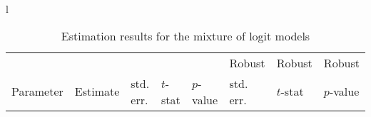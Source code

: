 \documentclass[12pt,a4paper]{article}
\begin{document}
\begin{sidewaystable}[htb]
\caption{\protect\label{tab:choiceOnly}Estimation results for the mixture of logit
models}
  \begin{tabular}{l}
\begin{tabular}{lr@{.}lr@{.}lr@{.}lr@{.}lr@{.}lr@{.}lr@{.}l}
                      &   \multicolumn{2}{l}{}    & \multicolumn{2}{l}{} & \multicolumn{2}{l}{}  &     \multicolumn{2}{l}{} &   \multicolumn{2}{l}{Robust}    & \multicolumn{2}{l}{Robust}  &     \multicolumn{2}{l}{Robust}   \\
Parameter      & \multicolumn{2}{l}{Estimate}  &
\multicolumn{2}{l}{std. err.}  &  \multicolumn{2}{l}{$t$-stat}  &   \multicolumn{2}{l}{$p$-value}  &
\multicolumn{2}{l}{std. err.}  &  \multicolumn{2}{l}{$t$-stat}  &   \multicolumn{2}{l}{$p$-value}   \\


\end{tabular}
\end{tabular}
\end{sidewaystable}
\end{document}
